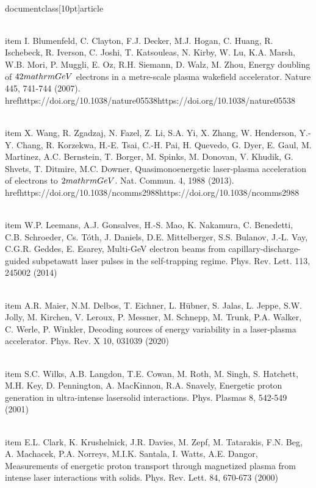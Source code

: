 \\documentclass[10pt]{article}
\begin{document}
{{{{{{  \\item I. Blumenfeld, C. Clayton, F.J. Decker, M.J. Hogan, C. Huang, R. Ischebeck, R. Iverson, C. Joshi, T. Katsouleas, N. Kirby, W. Lu, K.A. Marsh, W.B. Mori, P. Muggli, E. Oz, R.H. Siemann, D. Walz, M. Zhou, Energy doubling of $42 \\mathrm{GeV}$ electrons in a metre-scale plasma wakefield accelerator. Nature 445, 741-744 (2007). \\href{https://doi.org/10.1038/nature05538}{https://doi.org/10.1038/nature05538}

  \\item X. Wang, R. Zgadzaj, N. Fazel, Z. Li, S.A. Yi, X. Zhang, W. Henderson, Y.-Y. Chang, R. Korzekwa, H.-E. Tsai, C.-H. Pai, H. Quevedo, G. Dyer, E. Gaul, M. Martinez, A.C. Bernstein, T. Borger, M. Spinks, M. Donovan, V. Khudik, G. Shvets, T. Ditmire, M.C. Downer, Quasimonoenergetic laser-plasma acceleration of electrons to $2 \\mathrm{GeV}$. Nat. Commun. 4, 1988 (2013). \\href{https://doi.org/10.1038/ncomms2988}{https://doi.org/10.1038/ncomms2988}

  \\item W.P. Leemans, A.J. Gonsalves, H.-S. Mao, K. Nakamura, C. Benedetti, C.B. Schroeder, Cs. Tóth, J. Daniels, D.E. Mittelberger, S.S. Bulanov, J.-L. Vay, C.G.R. Geddes, E. Esarey, Multi-GeV electron beams from capillary-discharge-guided subpetawatt laser pulses in the self-trapping regime. Phys. Rev. Lett. 113, 245002 (2014)

  \\item A.R. Maier, N.M. Delbos, T. Eichner, L. Hübner, S. Jalas, L. Jeppe, S.W. Jolly, M. Kirchen, V. Leroux, P. Messner, M. Schnepp, M. Trunk, P.A. Walker, C. Werle, P. Winkler, Decoding sources of energy variability in a laser-plasma accelerator. Phys. Rev. X 10, 031039 (2020)

  \\item S.C. Wilks, A.B. Langdon, T.E. Cowan, M. Roth, M. Singh, S. Hatchett, M.H. Key, D. Pennington, A. MacKinnon, R.A. Snavely, Energetic proton generation in ultra-intense lasersolid interactions. Phys. Plasmas 8, 542-549 (2001)

  \\item E.L. Clark, K. Krushelnick, J.R. Davies, M. Zepf, M. Tatarakis, F.N. Beg, A. Machacek, P.A. Norreys, M.I.K. Santala, I. Watts, A.E. Dangor, Measurements of energetic proton transport through magnetized plasma from intense laser interactions with solids. Phys. Rev. Lett. 84, 670-673 (2000)

}}}}}}
\end{document}
